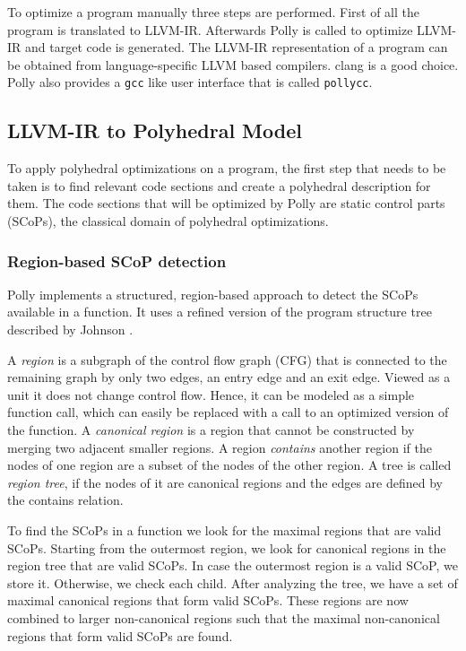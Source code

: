 To optimize a program manually three steps are performed. First of all the
program is translated to LLVM-IR. Afterwards Polly is called to optimize LLVM-IR and
target code is generated. The LLVM-IR representation of a program can
be obtained from language-specific LLVM based compilers. clang is a
good choice. Polly also provides a \texttt{gcc} like user interface that is
called \texttt{pollycc}.

\subsection{LLVM-IR to Polyhedral Model}

To apply polyhedral optimizations on a program, the first step that needs to be
taken is to find relevant code sections and create a polyhedral description for
them. The code sections that will be optimized by Polly are static
control parts (SCoPs), the classical domain of polyhedral optimizations.

\subsubsection{Region-based SCoP detection}
Polly implements a structured, region-based approach to detect
the SCoPs available in a function. It uses a refined version of the program
structure tree described by Johnson \cite{Johnson}.

A \emph{region} is a subgraph of the control flow graph (CFG) that is connected to the
remaining graph by only two edges, an entry edge and an exit edge.  Viewed as a
unit it does not change control flow. Hence, it can be modeled as a
simple function call, which can easily be replaced with a call to an optimized
version of the function.  A \emph{canonical region} is a region that cannot be
constructed by merging two adjacent smaller regions. A region \emph{contains}
another region if the nodes of one region are a subset of the nodes of the other
region. A tree is called \emph{region tree}, if the nodes of it are canonical regions
and the edges are defined by the contains relation.

To find the SCoPs in a function we look for the maximal regions that are valid
SCoPs. Starting from the outermost region, we look for canonical regions in the
region tree that are valid SCoPs. In case the outermost region is a valid SCoP,
we store it. Otherwise, we check each child. After analyzing the tree, we have a
set of maximal canonical regions that form valid SCoPs. These regions are now
combined to larger non-canonical regions such that the maximal 
non-canonical regions that form valid SCoPs are found.

